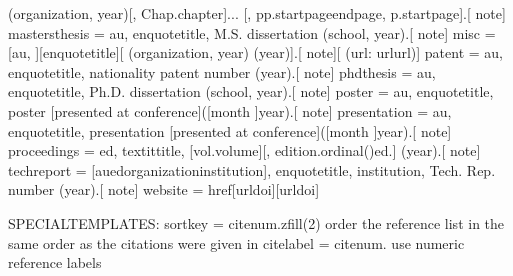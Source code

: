 \documentclass[letterpaper,10pt,english]{sphinxmanual}
\begin{document}
\begin{sphinxVerbatim} (\PYGZlt{}organization\PYGZgt{}, \PYGZlt{}year\PYGZgt{})[, Chap.\PYGZti{}\PYGZlt{}chapter\PYGZgt{}]...
        [, pp.\PYGZti{}\PYGZlt{}startpage\PYGZgt{}\PYGZhy{}\PYGZhy{}\PYGZlt{}endpage\PYGZgt{}\textbar{}, p.\PYGZti{}\PYGZlt{}startpage\PYGZgt{}].[ \PYGZlt{}note\PYGZgt{}]
mastersthesis = \PYGZlt{}au\PYGZgt{}, \PYGZbs{}enquote\PYGZob{}\PYGZlt{}title\PYGZgt{},\PYGZcb{} M.S. dissertation (\PYGZlt{}school\PYGZgt{}, \PYGZlt{}year\PYGZgt{}).[ \PYGZlt{}note\PYGZgt{}]
misc = [\PYGZlt{}au\PYGZgt{}, ][\PYGZbs{}enquote\PYGZob{}\PYGZlt{}title\PYGZgt{}\PYGZcb{}][ (\PYGZlt{}organization\PYGZgt{}, \PYGZlt{}year\PYGZgt{})\textbar{} (\PYGZlt{}year\PYGZgt{})].[ \PYGZlt{}note\PYGZgt{}][ (url: \PYGZbs{}url\PYGZob{}\PYGZlt{}url\PYGZgt{}\PYGZcb{})]
patent = \PYGZlt{}au\PYGZgt{}, \PYGZbs{}enquote\PYGZob{}\PYGZlt{}title\PYGZgt{},\PYGZcb{} \PYGZlt{}nationality\PYGZgt{} patent \PYGZlt{}number\PYGZgt{} (\PYGZlt{}year\PYGZgt{}).[ \PYGZlt{}note\PYGZgt{}]
phdthesis = \PYGZlt{}au\PYGZgt{}, \PYGZbs{}enquote\PYGZob{}\PYGZlt{}title\PYGZgt{},\PYGZcb{} Ph.D. dissertation (\PYGZlt{}school\PYGZgt{}, \PYGZlt{}year\PYGZgt{}).[ \PYGZlt{}note\PYGZgt{}]
poster = \PYGZlt{}au\PYGZgt{}, \PYGZbs{}enquote\PYGZob{}\PYGZlt{}title\PYGZgt{}\PYGZcb{}, poster [presented at \PYGZlt{}conference\PYGZgt{}]([\PYGZlt{}month\PYGZgt{} ]\PYGZlt{}year\PYGZgt{}).[ \PYGZlt{}note\PYGZgt{}]
presentation = \PYGZlt{}au\PYGZgt{}, \PYGZbs{}enquote\PYGZob{}\PYGZlt{}title\PYGZgt{}\PYGZcb{}, presentation [presented at \PYGZlt{}conference\PYGZgt{}]([\PYGZlt{}month\PYGZgt{} ]\PYGZlt{}year\PYGZgt{}).[ \PYGZlt{}note\PYGZgt{}]
proceedings = \PYGZlt{}ed\PYGZgt{}, \PYGZbs{}textit\PYGZob{}\PYGZlt{}title\PYGZgt{}\PYGZcb{}, [vol.\PYGZti{}\PYGZlt{}volume\PYGZgt{}][, \PYGZlt{}edition.ordinal()\PYGZgt{}\PYGZti{}ed.] (\PYGZlt{}year\PYGZgt{}).[ \PYGZlt{}note\PYGZgt{}]
techreport = [\PYGZlt{}au\PYGZgt{}\textbar{}\PYGZlt{}ed\PYGZgt{}\textbar{}\PYGZlt{}organization\PYGZgt{}\textbar{}\PYGZlt{}institution\PYGZgt{}\textbar{}], \PYGZbs{}enquote\PYGZob{}\PYGZlt{}title\PYGZgt{},\PYGZcb{} \PYGZlt{}institution\PYGZgt{}, Tech. Rep. \PYGZlt{}number\PYGZgt{} (\PYGZlt{}year\PYGZgt{}).[ \PYGZlt{}note\PYGZgt{}]
website = \PYGZbs{}href\PYGZob{}[\PYGZlt{}url\PYGZgt{}\textbar{}\PYGZlt{}doi\PYGZgt{}]\PYGZcb{}\PYGZob{}[\PYGZlt{}url\PYGZgt{}\textbar{}\PYGZlt{}doi\PYGZgt{}]\PYGZcb{}

SPECIAL\PYGZhy{}TEMPLATES:
sortkey = \PYGZlt{}citenum.zfill(2)\PYGZgt{}              \PYGZsh{}\PYGZsh{} order the reference list in the same order as the citations were given in
citelabel = \PYGZlt{}citenum\PYGZgt{}.                    \PYGZsh{}\PYGZsh{} use numeric reference labels


\end{sphinxVerbatim}
\end{document}
